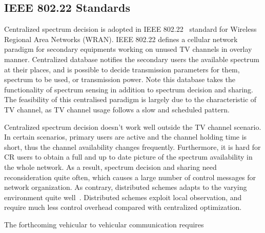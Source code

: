 \subsection{IEEE 802.22 Standards}
Centralized spectrum decision is adopted in IEEE 802.22~\cite{802.22} standard for Wireless Regional Area Networks (WRAN).
IEEE 802.22 defines a cellular network paradigm for secondary equipments working on unused TV channels in overlay manner.
Centralized database notifies the secondary users the available spectrum at their places, and is possible to decide transmission parameters for them, \ie spectrum to be used, or transmission power.
Note this database takes the functionality of spectrum sensing in addition to spectrum decision and sharing.
The feasibility of this centralised paradigm is largely due to the characteristic of TV channel, as TV channel usage follows a slow and scheduled pattern. 

Centralized spectrum decision doesn't work well outside the TV channel scenario.
In certain scenarios, primary users are active and the channel holding time is short, thus the channel availability changes frequently.
Furthermore, it is hard for CR users to obtain a full and up to date picture of the spectrum availability in the whole network.
As a result, spectrum decision and sharing need reconsideration quite often, which causes a large number of control messages for network organization.
As contrary, distributed schemes adapts to the varying environment quite well~\cite{Selforganization_CRN_13}.
Distributed schemes exploit local observation, and require much less control overhead compared with centralized optimization.

The forthcoming vehicular to vehicular communication requires





